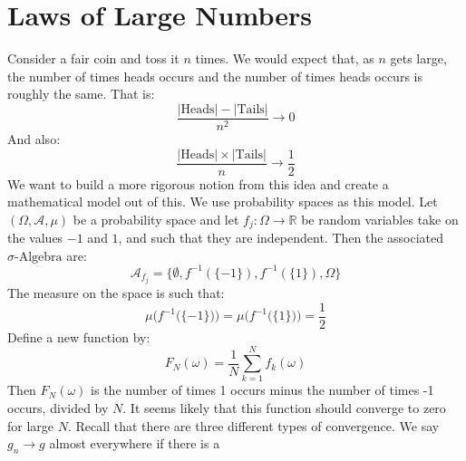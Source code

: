         \section{Laws of Large Numbers}
            Consider a fair coin and toss it $n$ times. We would
            expect that, as $n$ gets large, the number of times
            heads occurs and the number of times heads occurs is
            roughly the same. That is:
            \begin{equation}
                \frac{|\textrm{Heads}|-|\textrm{Tails}|}{n^{2}}
                \rightarrow{0}
            \end{equation}
            And also:
            \begin{equation}
                \frac{|\textrm{Heads}|\times|\textrm{Tails}|}{n}
                \rightarrow\frac{1}{2}
            \end{equation}
            We want to build a more rigorous notion from this idea
            and create a mathematical model out of this. We use
            probability spaces as this model. Let
            $(\Omega,\mathcal{A},\mu)$ be a probability space and
            let $f_{j}:\Omega\rightarrow\mathbb{R}$ be random variables
            take on the values $\minus{1}$ and $1$, and such that
            they are independent. Then the associated
            $\sigma\textrm{-Algebra}$ are:
            \begin{equation}
                \mathcal{A}_{f_{j}}=
                \{\emptyset,f^{\minus{1}}(\{\minus{1}\}),
                    f^{\minus{1}}(\{1\}),\Omega\}
            \end{equation}
            The measure on the space is such that:
            \begin{equation}
                \mu\Big(f^{\minus{1}}\big(\{\minus{1}\}\big)\Big)=
                \mu\Big(f^{\minus{1}}\big(\{1\}\big)\Big)=
                \frac{1}{2}
            \end{equation}
            Define a new function by:
            \begin{equation}
                F_{N}(\omega)=\frac{1}{N}\sum_{k=1}^{N}f_{k}(\omega)
            \end{equation}
            Then $F_{N}(\omega)$ is the number of times 1 occurs
            minus the number of times -1 occurs, divided by $N$.
            It seems likely that this function should converge to
            zero for large $N$. Recall that there are three different
            types of convergence. We say
            $g_{n}\rightarrow{g}$ almost everywhere if there is a
